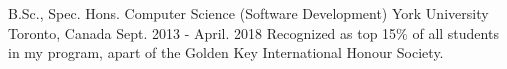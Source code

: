 


\begin{cventries}


\cventry
{B.Sc., Spec. Hons. Computer Science (Software Development)} %
{York University} %
{Toronto, Canada} %
{Sept. 2013 - April. 2018} %
{Recognized as top 15\% of all students in my program, apart of the Golden Key International Honour Society.}



\end{cventries}